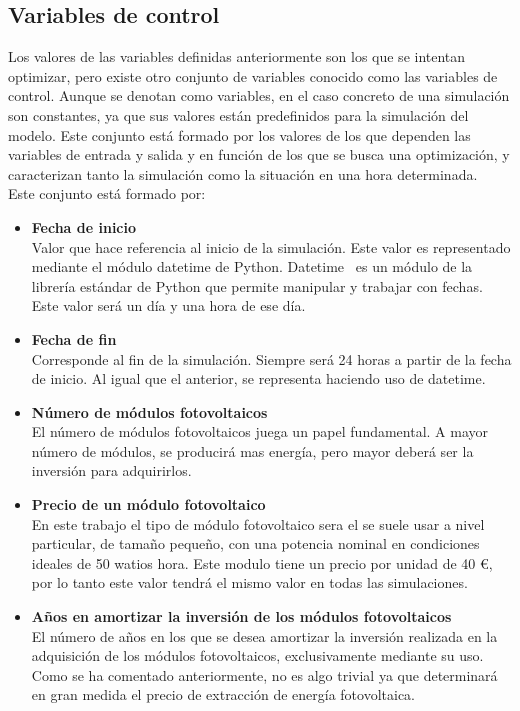 \subsection{Variables de control}
Los valores de las variables definidas anteriormente son los que se intentan optimizar, pero existe otro conjunto de variables conocido como las variables de control. Aunque se denotan como variables, en el caso concreto de una simulación son constantes, ya que sus valores están predefinidos para la simulación del modelo. Este conjunto está formado por los valores de los que dependen las variables de entrada y salida y en función de los que se busca una optimización, y caracterizan tanto la simulación como la situación en una hora determinada.\\
Este conjunto está formado por:
\begin{itemize}
	\item \textbf{Fecha de inicio}\\ Valor que hace referencia al inicio de la simulación. Este valor es representado mediante el módulo datetime de Python. Datetime~\cite{Dtpy} es un módulo de la librería estándar de Python que permite manipular y trabajar con fechas. Este valor será un día y una hora de ese día.
	\item \textbf{Fecha de fin}\\ Corresponde al fin de la simulación. Siempre será 24 horas a partir de la fecha de inicio. Al igual que el anterior, se representa haciendo uso de datetime.
	\item \textbf{Número de módulos fotovoltaicos}\\ El número de módulos fotovoltaicos juega un papel fundamental. A mayor número de módulos, se producirá mas energía, pero mayor deberá ser la inversión para adquirirlos.
	\item \textbf{Precio de un módulo fotovoltaico}\\ En este trabajo el tipo de módulo fotovoltaico sera el se suele usar a nivel particular, de tamaño pequeño, con una potencia nominal en condiciones ideales de 50 watios hora. Este modulo tiene un precio por unidad de 40 €, por lo tanto este valor tendrá el mismo valor en todas las simulaciones.
	\item \textbf{Años en amortizar la inversión de los módulos fotovoltaicos}\\ El número de años en los que se desea amortizar la inversión realizada en la adquisición de los módulos fotovoltaicos, exclusivamente mediante su uso. Como se ha comentado anteriormente, no es algo trivial ya que determinará en gran medida el precio de extracción de energía fotovoltaica.

\end{itemize}
